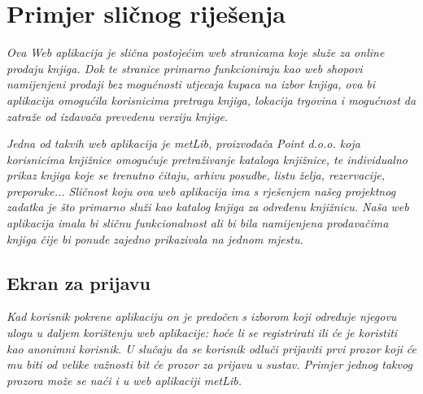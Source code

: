 	\section{Primjer sličnog riješenja}	
		
	\textit{Ova Web aplikacija je slična postojećim web stranicama koje služe za online prodaju knjiga. Dok te stranice primarno funkcioniraju kao web shopovi namijenjeni prodaji bez mogućnosti utjecaja kupaca na izbor knjiga, ova bi aplikacija omogućila korisnicima pretragu knjiga, lokacija trgovina i mogućnost da zatraže od izdavača prevedenu verziju knjige.}
	
	\textit{Jedna od takvih web aplikacija je metLib, proizvođača Point d.o.o. koja korisnicima knjižnice omogućuje pretraživanje kataloga knjižnice, te individualno prikaz knjiga koje se trenutno čitaju, arhivu posudbe, listu želja, rezervacije, preporuke... Sličnost koju ova web aplikacija ima s rješenjem našeg projektnog zadatka je što primarno služi kao katalog knjiga za određenu knjižnicu. Naša web aplikacija imala bi sličnu funkcionalnost ali bi bila namijenjena prodavačima knjiga čije bi ponude zajedno prikazivala na jednom mjestu.}
	
	\subsection{Ekran za prijavu}
	
	\textit{Kad korisnik pokrene aplikaciju on je predočen s izborom koji određuje njegovu ulogu u daljem korištenju web aplikacije: hoće li se registrirati ili će je koristiti kao anonimni korisnik. U slučaju da se korisnik odluči prijaviti prvi prozor koji će mu biti od velike važnosti bit će prozor za prijavu u sustav. Primjer jednog takvog prozora može se naći i u web aplikaciji metLib.}
		
